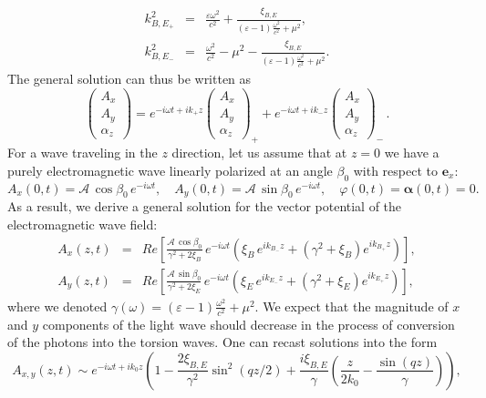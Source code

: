 \documentclass[12pt,prd,showkeys,amsmath,amssymb,nofootinbib]{revtex4-1}
\begin{document}
\begin{eqnarray}
k^2_{B,E_+} &=& \frac{\varepsilon\omega^2}{c^2}
+ \frac{\xi_{B,E}}{(\varepsilon - 1)\frac{\omega^2}{c^2}+\mu^2},\\
k^2_{B,E_-} &=& \frac{\omega^2}{c^2} - \mu^2
- \frac{\xi_{B,E}}{(\varepsilon - 1)\frac{\omega^2}{c^2}+\mu^2}.
\end{eqnarray}
The general solution can thus be written as 
\begin{equation}
\begin{pmatrix} A_x \\ A_y \\ \alpha_z \end{pmatrix} = e^{-i\omega t + ik_{+}z}
\begin{pmatrix} A_{x} \\ A_y \\ \alpha_z \end{pmatrix}_{+} + e^{-i\omega t + ik_{-}z}
\begin{pmatrix} A_{x} \\ A_y \\ \alpha_z \end{pmatrix}_{-}\,.
\end{equation}
For a wave traveling in the $z$ direction, let us assume that at $z=0$ we have a purely electromagnetic wave linearly polarized at an angle $\beta_0$ with respect to $\bm{e}_x$:
\begin{equation}
A_x(0,t) = {\mathcal A}\,\cos\beta_0\,e^{-i\omega t}, \quad
A_y(0,t) = {\mathcal A}\,\sin\beta_0\,e^{-i\omega t},\quad \varphi(0,t)=\bm{\alpha}(0,t) = 0.
\end{equation}
As a result, we derive a general solution for the vector potential of the electromagnetic wave field:
\begin{eqnarray}
A_x(z,t) &=& Re\left[\frac{{\mathcal A}\,\cos\beta_0}{\gamma^2 + 2\xi_B}\,e^{-i\omega t}\left(
{\xi_B}\,e^{ik_{B_-}z} + (\gamma^2 + \xi_B) e^{ik_{B_+}z}\right)\right],\label{Ax}\\
A_y(z,t) &=& Re\left[\frac{{\mathcal A}\,\sin\beta_0}{\gamma^2 + 2\xi_E}\,e^{-i\omega t}\left(
{\xi_E}\,e^{ik_{E_-}z} + (\gamma^2 + \xi_E) e^{ik_{E_+}z}\right)\right],\label{Ay}
\end{eqnarray}
where we denoted $\gamma(\omega)=(\varepsilon - 1)\frac{\omega^2}{c^2}+\mu^2.$ We expect that the magnitude of $x$ and $y$ components of the light wave should decrease in the process of conversion of the photons into the torsion waves. One can recast solutions into the form
\begin{equation}
A_{x,y}(z,t) \sim e^{- i\omega t + ik_0z}\left(1 - \frac{2\xi_{B,E}}{\gamma^2}\sin^2({qz}/{2})    
+\frac{i\xi_{B,E}}{\gamma}\left(\frac{z}{2k_0} - \frac{\sin(qz)}{\gamma}\right)\right),
\end{equation}
\end{document}
